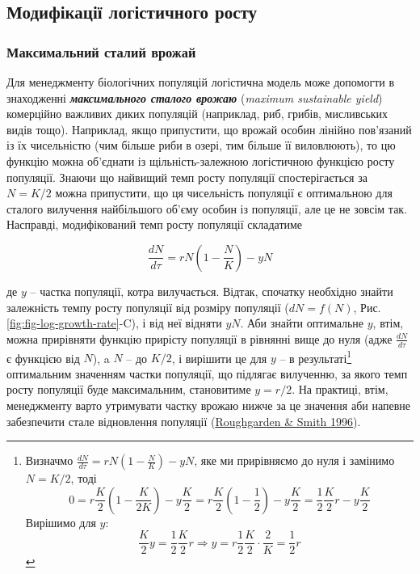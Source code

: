 \documentclass[
  11pt,
]{book}
\begin{document}
\subsection{Модифікації логістичного росту}\label{ux43cux43eux434ux438ux444ux456ux43aux430ux446ux456ux457-ux43bux43eux433ux456ux441ux442ux438ux447ux43dux43eux433ux43e-ux440ux43eux441ux442ux443}

\subsubsection{Максимальний сталий врожай}\label{ux43cux430ux43aux441ux438ux43cux430ux43bux44cux43dux438ux439-ux441ux442ux430ux43bux438ux439-ux432ux440ux43eux436ux430ux439}

Для менеджменту біологічних популяцій логістична модель може допомогти в знаходженні \textbf{\emph{максимального сталого врожаю}} (\emph{maximum sustainable yield}) комерційно важливих диких популяцій (наприклад, риб, грибів, мисливських видів тощо). Наприклад, якщо припустити, що врожай особин лінійно пов'язаний із їх чисельністю (чим більше риби в озері, тим більше її виловлюють), то цю функцію можна об'єднати із щільність-залежною логістичною функцією росту популяції. Знаючи що найвищий темп росту популяції спостерігається за \(N=K/2\) можна припустити, що ця чисельність популяції є оптимальною для сталого вилучення найбільшого об'єму особин із популяції, але це не зовсім так. Насправді, модифікований темп росту популяції складатиме

\[\frac{dN}{d\tau} = rN \left( 1-\frac{N}{K} \right) - yN\]

де \(y\) -- частка популяції, котра вилучається. Відтак, спочатку необхідно знайти залежність темпу росту популяції від розміру популяції (\(dN = f(N)\), Рис. \ref{fig:fig-log-growth-rate}-C), і від неї відняти \(yN\). Аби знайти оптимальне \(y\), втім, можна прирівняти функцію прирісту популяції в рівнянні вище до нуля (адже \(\frac{dN}{d\tau}\) є функцією від \(N\)), a \(N\) -- до \(K/2\), і вирішити це для \(y\) -- в результаті\footnote{Визначмо \(\frac{dN}{d\tau} = rN(1-\frac{N}{K}) - yN\), яке ми прирівняємо до нуля і замінимо \(N = K/2\), тоді \[0 = r \frac{K}{2}(1 - \frac{K}{2K}) - y \frac{K}{2} = r \frac{K}{2}(1 - \frac{1}{2}) - y \frac{K}{2} = \frac{1}{2} \frac{K}{2}r - y \frac{K}{2}\] Вирішимо для \(y\): \[\frac{K}{2}y = \frac{1}{2} \frac{K}{2} r \Rightarrow y = r \frac{1}{2} \frac{K}{2} \cdot \frac{2}{K} = \frac{1}{2}r\]} оптимальним значенням частки популяції, що підлягає вилученню, за якого темп росту популяції буде максимальним, становитиме \(y = r/2\). На практиці, втім, менеджменту варто утримувати частку врожаю нижче за це значення аби напевне забезпечити стале відновлення популяції (\href{https://doi.org/10.1073/pnas.93.10.5078}{Roughgarden \& Smith 1996}).
\end{document}
